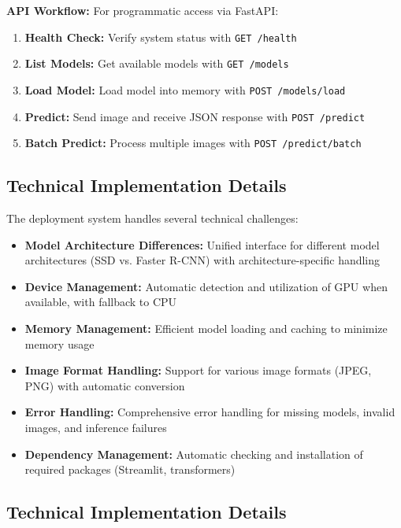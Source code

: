 \documentclass[12pt,a4paper]{article}
\begin{document}
\textbf{API Workflow:}
For programmatic access via FastAPI:

\begin{enumerate}
    \item \textbf{Health Check:} Verify system status with \texttt{GET /health}
    \item \textbf{List Models:} Get available models with \texttt{GET /models}
    \item \textbf{Load Model:} Load model into memory with \texttt{POST /models/load}
    \item \textbf{Predict:} Send image and receive JSON response with \texttt{POST /predict}
    \item \textbf{Batch Predict:} Process multiple images with \texttt{POST /predict/batch}
\end{enumerate}

\subsection{Technical Implementation Details}

The deployment system handles several technical challenges:

\begin{itemize}
    \item \textbf{Model Architecture Differences:} Unified interface for different model architectures (SSD vs. Faster R-CNN) with architecture-specific handling
    \item \textbf{Device Management:} Automatic detection and utilization of GPU when available, with fallback to CPU
    \item \textbf{Memory Management:} Efficient model loading and caching to minimize memory usage
    \item \textbf{Image Format Handling:} Support for various image formats (JPEG, PNG) with automatic conversion
    \item \textbf{Error Handling:} Comprehensive error handling for missing models, invalid images, and inference failures
    \item \textbf{Dependency Management:} Automatic checking and installation of required packages (Streamlit, transformers)
\end{itemize}

\subsection{Technical Implementation Details}
\end{document}
